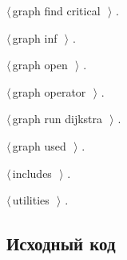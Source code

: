 \documentclass[12pt]{article}
\begin{document}
{\begin{list}{}{\setlength{\itemsep}{-\parsep}\setlength{\itemindent}{-\leftmargin}}
\item $\langle\,$graph find critical\nobreak\ {\footnotesize {}}$\,\rangle$ {\footnotesize {\NWtxtRefIn} .}
\item $\langle\,$graph inf\nobreak\ {\footnotesize {}}$\,\rangle$ {\footnotesize {\NWtxtRefIn} .}
\item $\langle\,$graph open\nobreak\ {\footnotesize {}}$\,\rangle$ {\footnotesize {\NWtxtRefIn} .}
\item $\langle\,$graph operator\nobreak\ {\footnotesize {}}$\,\rangle$ {\footnotesize {\NWtxtRefIn} .}
\item $\langle\,$graph run dijkstra\nobreak\ {\footnotesize {}}$\,\rangle$ {\footnotesize {\NWtxtRefIn} .}
\item $\langle\,$graph used\nobreak\ {\footnotesize {}}$\,\rangle$ {\footnotesize {\NWtxtRefIn} .}
\item $\langle\,$includes\nobreak\ {\footnotesize {}}$\,\rangle$ {\footnotesize {\NWtxtRefIn} .}
\item $\langle\,$utilities\nobreak\ {\footnotesize {}}$\,\rangle$ {\footnotesize {\NWtxtRefIn} .}
\end{list}}

\subsection{Исходный код}
\end{document}
